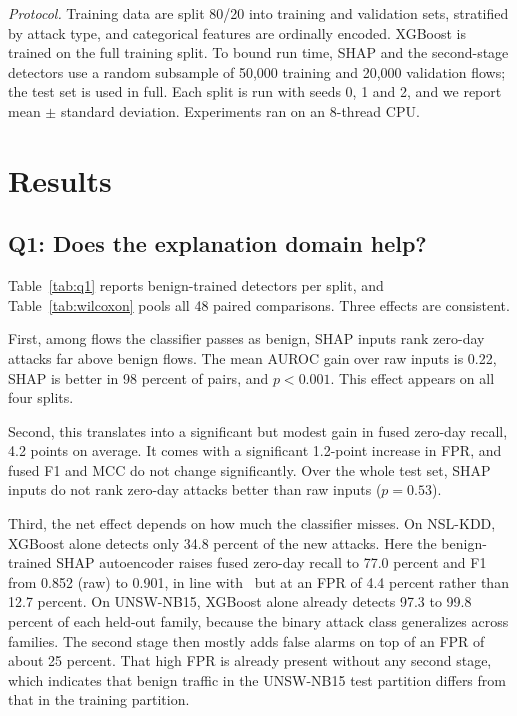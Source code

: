 \documentclass[conference]{IEEEtran}
\begin{document}
\textit{Protocol.} Training data are split 80/20 into training and validation sets, stratified by attack type, and categorical features are ordinally encoded. XGBoost is trained on the full training split. To bound run time, SHAP and the second-stage detectors use a random subsample of 50,000 training and 20,000 validation flows; the test set is used in full. Each split is run with seeds 0, 1 and 2, and we report mean $\pm$ standard deviation. Experiments ran on an 8-thread CPU.

\section{Results}
\subsection{Q1: Does the explanation domain help?}
Table~\ref{tab:q1} reports benign-trained detectors per split, and Table~\ref{tab:wilcoxon} pools all 48 paired comparisons. Three effects are consistent.

First, among flows the classifier passes as benign, SHAP inputs rank zero-day attacks far above benign flows. The mean AUROC gain over raw inputs is 0.22, SHAP is better in 98 percent of pairs, and $p<0.001$. This effect appears on all four splits.

Second, this translates into a significant but modest gain in fused zero-day recall, 4.2 points on average. It comes with a significant 1.2-point increase in FPR, and fused F1 and MCC do not change significantly. Over the whole test set, SHAP inputs do not rank zero-day attacks better than raw inputs ($p=0.53$).

Third, the net effect depends on how much the classifier misses. On NSL-KDD, XGBoost alone detects only 34.8 percent of the new attacks. Here the benign-trained SHAP autoencoder raises fused zero-day recall to 77.0 percent and F1 from 0.852 (raw) to 0.901, in line with~\cite{barnard2022robust} but at an FPR of 4.4 percent rather than 12.7 percent. On UNSW-NB15, XGBoost alone already detects 97.3 to 99.8 percent of each held-out family, because the binary attack class generalizes across families. The second stage then mostly adds false alarms on top of an FPR of about 25 percent. That high FPR is already present without any second stage, which indicates that benign traffic in the UNSW-NB15 test partition differs from that in the training partition.
\end{document}
